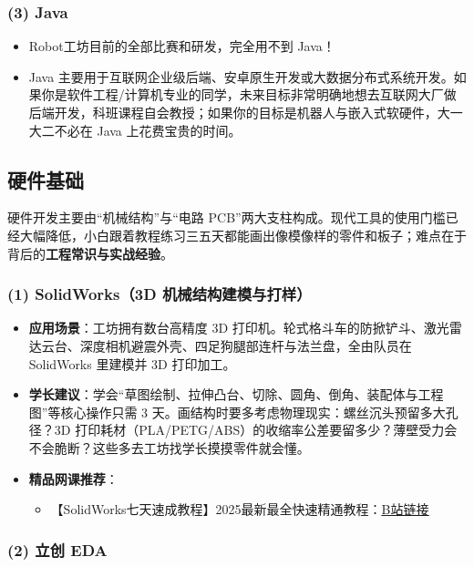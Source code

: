 \documentclass[a4paper,11pt,oneside]{scrreprt}
\begin{document}
\subsubsection*{(3) Java}

\begin{itemize}
    \item Robot工坊目前的全部比赛和研发，完全用不到 Java！
    \item Java 主要用于互联网企业级后端、安卓原生开发或大数据分布式系统开发。如果你是软件工程/计算机专业的同学，未来目标非常明确地想去互联网大厂做后端开发，科班课程自会教授；如果你的目标是机器人与嵌入式软硬件，大一大二不必在 Java 上花费宝贵的时间。
\end{itemize}

\subsection{硬件基础}

硬件开发主要由“机械结构”与“电路 PCB”两大支柱构成。现代工具的使用门槛已经大幅降低，小白跟着教程练习三五天都能画出像模像样的零件和板子；难点在于背后的\textbf{工程常识与实战经验}。

\subsubsection*{(1) SolidWorks（3D 机械结构建模与打样）}

\begin{itemize}
    \item \textbf{应用场景}：工坊拥有数台高精度 3D 打印机。轮式格斗车的防掀铲斗、激光雷达云台、深度相机避震外壳、四足狗腿部连杆与法兰盘，全由队员在 SolidWorks 里建模并 3D 打印加工。
    \item \textbf{学长建议}：学会“草图绘制、拉伸凸台、切除、圆角、倒角、装配体与工程图”等核心操作只需 3 天。画结构时要多考虑物理现实：螺丝沉头预留多大孔径？3D 打印耗材（PLA/PETG/ABS）的收缩率公差要留多少？薄壁受力会不会脆断？这些多去工坊找学长摸摸零件就会懂。
    \item \textbf{精品网课推荐}：
    \begin{itemize}
        \item 【SolidWorks七天速成教程】2025最新最全快速精通教程：\href{https://www.bilibili.com/video/BV1Qr32zcEFy/}{\underline{B站链接}}
    \end{itemize}
\end{itemize}

\subsubsection*{(2) 立创 EDA}
\end{document}
